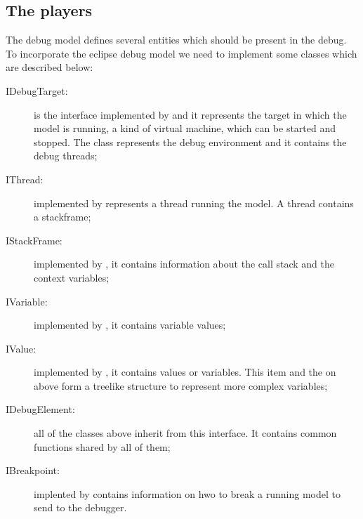 \subsection{The players}
The debug model defines several entities which should be present in the debug. To incorporate the eclipse debug model we need to implement some classes which are described below:
\begin{description}
\item[IDebugTarget:] is the interface implemented by  and it represents the target in which the model is running, a kind of virtual machine, which can be started and stopped. The class represents the debug environment and it contains the debug threads;

\item[IThread:] implemented by  represents a thread running the model. A thread contains a stackframe;

\item[IStackFrame:] implemented by , it contains information about the call stack and the context variables;

\item[IVariable:] implemented by , it contains variable values;

\item[IValue:]  implemented by , it contains values or variables. This item and the on above form a treelike structure to represent more complex variables;

\item[IDebugElement:] all of the classes above inherit from this interface. It contains common functions shared by all of them;

\item[IBreakpoint:] implented by  contains information on hwo to break a running model to send to the debugger.
\end{description} 

